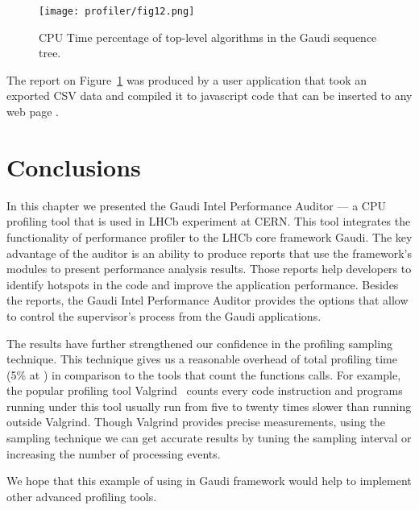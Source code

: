 \begin{figure}[H]
\begin{minipage}{\textwidth}
\begin{center}
\texttt{[image: profiler/fig12.png]}
\caption{\label{fig12}CPU Time percentage of top-level algorithms in the Gaudi sequence tree.}
\end{center}
\end{minipage}
\end{figure}

The report on Figure~\ref{fig12} was produced by a user application that took
an exported CSV data and compiled it to javascript code that can be inserted to
any web page \cite{reports}.

\section{Conclusions}
In this chapter we presented the Gaudi Intel Performance Auditor --- a CPU
profiling tool that is used in LHCb experiment at CERN. This tool integrates
the functionality of \iamp performance profiler to the LHCb core framework
Gaudi. The key advantage of the auditor is an ability to produce reports that
use the framework's modules to present performance analysis results. Those
reports help  developers to identify hotspots in the code and improve the
application performance. Besides the reports, the Gaudi Intel Performance
Auditor provides the options that allow to control the \iamp supervisor’s
process from the Gaudi applications.

The results have further strengthened our confidence in the profiling sampling
technique. This technique gives us a reasonable overhead of total profiling
time (5\% at \iamp) in comparison to the tools that count the functions calls.
For example, the popular profiling tool Valgrind~\cite{valgrind} counts every
code instruction and programs running under this tool usually run from five to
twenty times  slower than running outside Valgrind. Though Valgrind provides
precise measurements, using the sampling technique we can get accurate results
by tuning the sampling interval or increasing the number of processing events.

We hope that this example of using \iamp in  Gaudi framework would help to
implement other advanced profiling tools.
